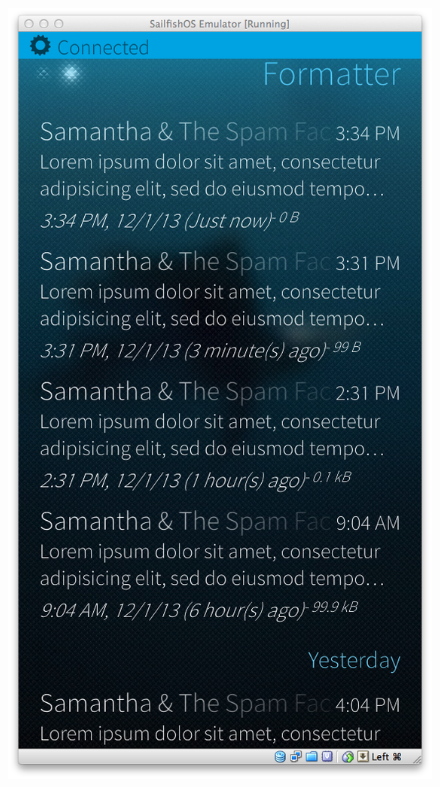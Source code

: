 \begin{figure}[H]
{  \includegraphics[scale=0.3]{../media/gfx/silica/silica08.png}
  \label{fig:silica08}
}
\end{figure}
%
